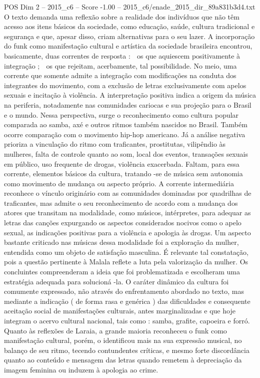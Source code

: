 \begin{textsample}{POS Dim 2 – 2015\_c6 – Score -1.00 – 2015\_c6/enade\_2015\_dir\_89a831b3d4.txt}
O texto demanda uma reflexão sobre a realidade dos indivíduos que não têm acesso aos itens básicos da sociedade, como educação, saúde, cultura tradicional e segurança e que, apesar disso, criam alternativas para o seu lazer.
A incorporação do funk como manifestação cultural e artística da sociedade brasileira encontrou, basicamente, duas correntes de resposta :  os que aquiescem positivamente à integração ;  os que rejeitam, acerbamente, tal possibilidade.
No meio, uma corrente que somente admite a integração com modificações na conduta dos integrantes do movimento, com a exclusão de letras exclusivamente com apelos sexuais e incitação à violência.
A interpretação positiva indica a origem da música na periferia, notadamente nas comunidades cariocas e sua projeção para o Brasil e o mundo.
Nessa perspectiva, surge o reconhecimento como cultura popular comparada ao samba, axé e outros ritmos também nascidos no Brasil.
Também ocorre comparação com o movimento hip-hop americano.
Já a análise negativa prioriza a vinculação do ritmo com traficantes, prostitutas, vilipêndio às mulheres, falta de controle quanto ao som, local dos eventos, transações sexuais em público, uso frequente de drogas, violência exacerbada.
Faltam, para essa corrente, elementos básicos da cultura, tratando -se de música sem autonomia como movimento de mudança ou aspecto próprio.
A corrente intermediária reconhece o vínculo originário com as comunidades dominadas por quadrilhas de traficantes, mas admite o seu reconhecimento de acordo com a mudança dos atores que transitam na modalidade, como músicos, intérpretes, para adequar as letras das canções expurgando os aspectos considerados nocivos como o apelo sexual, as indicações positivas para a violência e apologia às drogas.
Um aspecto bastante criticado nas músicas dessa modalidade foi a exploração da mulher, entendida como um objeto de satisfação masculina.
É relevante tal constatação, pois a questão pertinente à Malala reflete a luta pela valorização da mulher.
Os concluintes compreenderam a ideia que foi problematizada e escolheram uma estratégia adequada para solucioná -la.
O caráter dinâmico da cultura foi comumente expressado, não através do enfrentamento abordado no texto, mas mediante a indicação ( de forma rasa e genérica ) das dificuldades e consequente aceitação social de manifestações culturais, antes marginalizadas e que hoje integram o acervo cultural nacional, tais como : samba, grafite, capoeira e forró.
Quanto às reflexões de Laraia, a grande maioria reconheceu o funk como manifestação cultural, porém, o identificou mais na sua expressão musical, no balanço de seu ritmo, tecendo contundentes críticas, e mesmo forte discordância quanto ao conteúdo e mensagem das letras quando remetem à depreciação da imagem feminina ou induzem à apologia ao crime.

\end{textsample}
